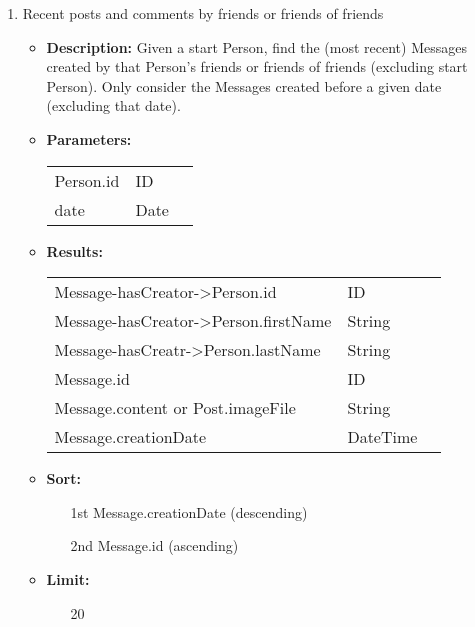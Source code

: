 {\begin{enumerate}
    \item Recent posts and comments by friends or friends of friends
        \begin{itemize}
            \item \textbf{Description:}
              Given a start Person, find the (most recent) Messages created
                by that Person's friends or friends of friends (excluding start
                Person). Only consider the Messages created before a given
                date (excluding that date).
            \item \textbf{Parameters:} \\
                \begin{tabular}{lll}
                    Person.id 	 						& ID & \parbox[t]{20cm}{\par \strut} \\
                    date 		 						& Date & \parbox[t]{20cm}{\par \strut} \\
                \end{tabular}
            \item \textbf{Results:} \\
                \begin{tabular}{lll}
                  Message-hasCreator->Person.id 	 								& ID & \parbox[t]{20cm}{\par \strut} \\
                  Message-hasCreator->Person.firstName 	 						& String & \parbox[t]{20cm}{\par \strut} \\
                  Message-hasCreatr->Person.lastName 	 						& String & \parbox[t]{20cm}{\par \strut} \\
                    Message.id  	 						& ID & \parbox[t]{20cm}{\par \strut} \\
                    Message.content or Post.imageFile	& String & \parbox[t]{20cm}{\par \strut} \\
                    Message.creationDate 	 	& DateTime & \parbox[t]{20cm}{\par \strut} \\
                \end{tabular}
             \item \textbf{Sort:}
                  \begin{itemize}
                    \item[1st] Message.creationDate (descending)
                    \item[2nd] Message.id (ascending)
                  \end{itemize}
             \item \textbf{Limit:}
                  \begin{itemize}
                    \item[] 20
                  \end{itemize}
        \end{itemize}


\end{enumerate}}
